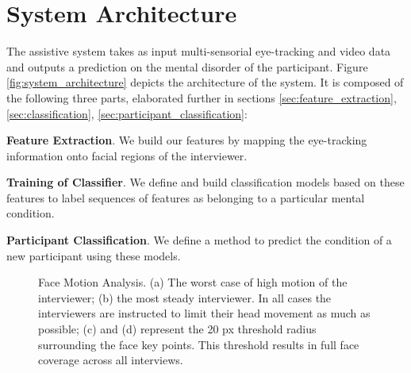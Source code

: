 \documentclass[10pt,twocolumn,letterpaper]{article}
\begin{document}
\section{System Architecture}
The assistive system takes as input multi-sensorial eye-tracking and video data and outputs a prediction on the mental disorder of the participant. Figure \ref{fig:system_architecture} depicts the architecture of the system. It is composed of the following three parts, elaborated further in sections \ref{sec:feature_extraction}, \ref{sec:classification}, \ref{sec:participant_classification}:

\textbf{Feature Extraction}. We build our features by mapping the eye-tracking information onto facial regions of the interviewer. 

\textbf{Training of Classifier}. We define and build classification models based on these features to label sequences of features as belonging to a particular mental condition.  

\textbf{Participant Classification}. We define a method to predict the condition of a new participant using these models. 

\begin{figure}
                  \hfill   
                 \hfill
                 \hfill
    \caption{Face Motion Analysis. (a) The worst case of high motion of the interviewer; (b) the most steady interviewer. In all cases the interviewers are instructed to limit their head movement as much as possible; (c) and (d) represent the 20 px threshold radius surrounding the face key points. This threshold results in full face coverage across all interviews.}
\label{fig:PERSON}
\end{figure}
\end{document}

